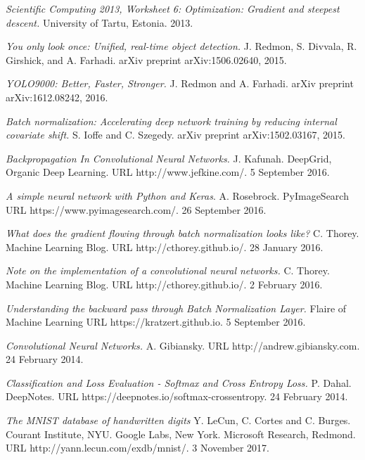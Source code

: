 \documentclass[a4paper,11pt,twoside]{article}
\begin{document}
\begin{thebibliography}{99}
	
	\textit{Scientific Computing 2013, Worksheet 6: Optimization: Gradient and steepest descent.}
    University of Tartu, Estonia.
    2013.
    
	\textit{You only look once: Unified, real-time object detection.}
    J. Redmon, S. Divvala, R. Girshick, and A. Farhadi. 
    arXiv preprint arXiv:1506.02640, 2015.
    
	\textit{{YOLO9000:} Better, Faster, Stronger.}
    J. Redmon and
               A. Farhadi. 
    arXiv preprint arXiv:1612.08242, 2016.
    
	\textit{Batch normalization: Accelerating deep network training by reducing internal covariate shift.}
    S. Ioffe and C. Szegedy. 
	arXiv preprint arXiv:1502.03167, 2015.
    
	\textit{Backpropagation In Convolutional Neural Networks.}
	J. Kafunah.
    DeepGrid, Organic Deep Learning. 
    URL http://www.jefkine.com/.
	5 September 2016.

	\textit{A simple neural network with Python and Keras}.
	A. Rosebrock.
	PyImageSearch
	URL https://www.pyimagesearch.com/.
	26 September 2016.
	
	\textit{What does the gradient flowing through batch normalization looks like?}
	C. Thorey.
    Machine Learning Blog. 
    URL http://cthorey.github.io/.
	28 January 2016.
	
	\textit{Note on the implementation of a convolutional neural networks.}
	C. Thorey.
    Machine Learning Blog. 
    URL http://cthorey.github.io/.
	2 February 2016.
	
	\textit{Understanding the backward pass through Batch Normalization Layer.}
	Flaire of Machine Learning
    URL https://kratzert.github.io.
	5 September 2016.
	
	\textit{Convolutional Neural Networks.}
	A. Gibiansky.
    URL http://andrew.gibiansky.com.
	24 February 2014.
	
	\textit{Classification and Loss Evaluation - Softmax and Cross Entropy Loss.}
	P. Dahal. 
	DeepNotes.
    URL https://deepnotes.io/softmax-crossentropy.
	24 February 2014.
	
	\textit{The MNIST database of handwritten digits}
	Y. LeCun, C. Cortes and C. Burges. Courant Institute, NYU. Google Labs, New York. Microsoft Research, Redmond. 
	URL http://yann.lecun.com/exdb/mnist/.
	3 November 2017.
	

\end{thebibliography}
\end{document}
